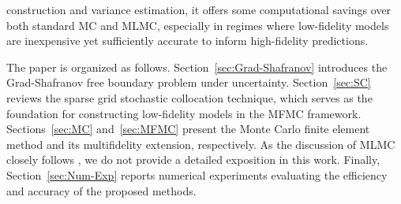 construction and variance estimation, it offers some computational savings over both standard MC and MLMC, especially in regimes where low-fidelity models are inexpensive yet sufficiently accurate to inform high-fidelity predictions.



The paper is organized as follows. Section~\ref{sec:Grad-Shafranov} introduces the Grad-Shafranov free boundary problem under uncertainty. Section~\ref{sec:SC} reviews the sparse grid stochastic collocation technique, which serves as the foundation for constructing low-fidelity models in the MFMC framework. Sections~\ref{sec:MC} and~\ref{sec:MFMC} present the Monte Carlo finite element method and its multifidelity extension, respectively. As the discussion of MLMC closely follows \cite{ElLiSa:2025}, we do not provide a detailed exposition in this work. Finally, Section~\ref{sec:Num-Exp} reports numerical experiments evaluating the efficiency and accuracy of the proposed methods.

 






